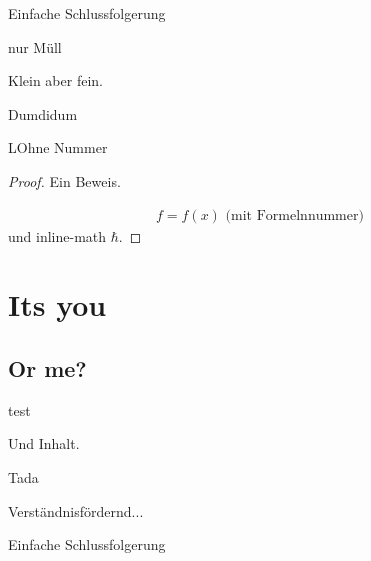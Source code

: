 \documentclass[ngerman,a4paper]{report}
\theoremstyle{break}
\theoremstyle{nonumberbreak}
\begin{document}
\begin{trueconclusion}[Ergänzung]
	Einfache Schlussfolgerung
\end{trueconclusion}

\begin{truelemma}
	nur Müll
\end{truelemma}

\begin{truelemma}
	Klein aber fein.
\end{truelemma}

\begin{trueremark}[Hossa]
	Dumdidum
\end{trueremark}

\begin{trueexample}[Test]
	LOhne Nummer
\end{trueexample}

\begin{proof}
	Ein Beweis.
	
	\begin{align}
		f = f(x) \text{ (mit Formelnnummer)}
	\end{align}
	und inline-math $\hbar$.
\end{proof}

\chapter{Its you}

\section{Or me?}

\begin{truetheorem}
    test
\end{truetheorem}

\begin{trueproposition}
    Und Inhalt.
\end{trueproposition}

\begin{truedefinition}
    Tada
\end{truedefinition}

\begin{trueexample}
    Verständnisfördernd...
\end{trueexample}

\begin{trueconclusion}[Ergänzung]
    Einfache Schlussfolgerung
\end{trueconclusion}
\end{document}
